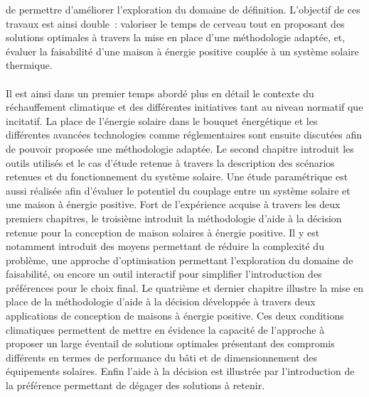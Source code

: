 de permettre d’améliorer l’exploration du domaine de définition.
L’objectif de ces travaux est ainsi double~: valoriser le temps de
cerveau tout en proposant des solutions optimales à travers la mise en place d’une
méthodologie adaptée, et, évaluer la faisabilité d’une maison à énergie positive couplée à
un système solaire thermique.

\paragraph{} %
Il est ainsi dans un premier temps abordé plus en détail le contexte du réchauffement
climatique et des différentes initiatives tant au niveau normatif que incitatif. La place
de l’énergie solaire dans le bouquet énergétique et les différentes avancées technologies
comme réglementaires sont ensuite discutées afin de pouvoir proposée une méthodologie
adaptée. Le second chapitre introduit les outils utilisés et le cas d’étude retenue à
travers la description des scénarios retenues et du fonctionnement du système solaire. Une
étude paramétrique est aussi réalisée afin d’évaluer le potentiel du couplage entre un
système solaire et une maison à énergie positive. Fort de l’expérience acquise à travers
les deux premiers chapitres, le troisième introduit la méthodologie d’aide à la décision
retenue pour la conception de maison solaires à énergie positive. Il y est notamment
introduit des moyens permettant de réduire la complexité du problème, une approche
d’optimisation permettant l’exploration du domaine de faisabilité, ou encore un outil
interactif pour simplifier l’introduction des préférences pour le choix final. Le
quatrième et dernier chapitre illustre la mise en place de la méthodologie d’aide à la
décision développée à travers deux applications de conception de maisons à énergie
positive. Ces deux conditions climatiques permettent de mettre en évidence la capacité de
l’approche à proposer un large éventail de solutions optimales présentant des compromis
différents en termes de performance du bâti et de dimensionnement des équipements
solaires. Enfin l’aide à la décision est illustrée par l’introduction de la préférence
permettant de dégager des solutions à retenir.
